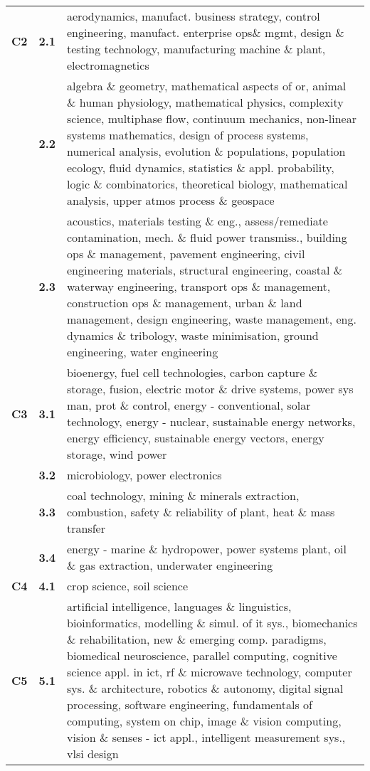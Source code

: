 \begin{spacing}{0.9}
\begin{longtable}[r]{r|r|p{11.5cm}}
\hline
\textbf{C2}
& \textbf{2.1} & {aerodynamics, manufact. business strategy, control engineering, manufact. enterprise ops\& mgmt, design \& testing technology, manufacturing machine \& plant, electromagnetics
}\\
& \textbf{2.2} & {algebra \& geometry, mathematical aspects of or, animal \& human physiology, mathematical physics, complexity science, multiphase flow, continuum mechanics, non-linear systems mathematics, design of process systems, numerical analysis, evolution \& populations, population ecology, fluid dynamics, statistics \& appl. probability, logic \& combinatorics, theoretical biology, mathematical analysis, upper atmos process \& geospace}\\
& \textbf{2.3} & {acoustics, materials testing \& eng., assess/remediate contamination, mech. \& fluid power transmiss., building ops \& management, pavement engineering, civil engineering materials, structural engineering, coastal \& waterway engineering, transport ops \& management, construction ops \& management, urban \& land management, design engineering, waste management, eng. dynamics \& tribology, waste minimisation, ground engineering, water engineering}\\
\hline
\textbf{C3}
& \textbf{3.1} & {bioenergy, fuel cell technologies, carbon capture \& storage, fusion, electric motor \& drive systems, power sys man, prot \& control, energy - conventional, solar technology, energy - nuclear, sustainable energy networks, energy efficiency, sustainable energy vectors, energy storage, wind power}\\
& \textbf{3.2} & {microbiology, power electronics}\\
& \textbf{3.3} & {coal technology, mining \& minerals extraction, combustion, safety \& reliability of plant, heat \& mass transfer}\\
& \textbf{3.4} & {energy - marine \& hydropower, power systems plant, oil \& gas extraction, underwater engineering}\\
\hline
\textbf{C4}
& \textbf{4.1} & {crop science, soil science}\\
\hline
\textbf{C5}
& \textbf{5.1} & {artificial intelligence, languages \& linguistics, bioinformatics, modelling \& simul. of it sys., biomechanics \& rehabilitation, new \& emerging comp. paradigms, biomedical neuroscience, parallel computing, cognitive science appl. in ict, rf \& microwave technology, computer sys. \& architecture, robotics \& autonomy, digital signal processing, software engineering, fundamentals of computing, system on chip, image \& vision computing, vision \& senses - ict appl., intelligent measurement sys., vlsi design}\\

\end{longtable}
\end{spacing}
